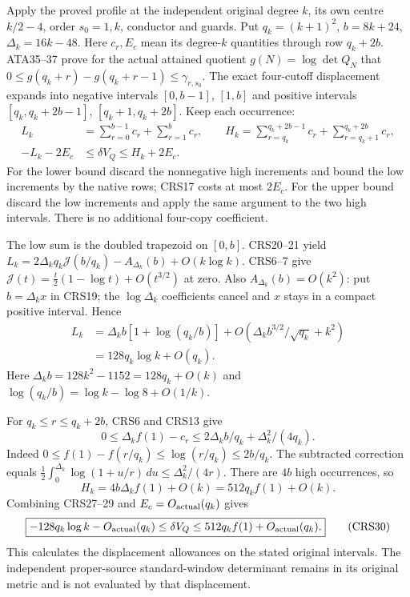 Apply the proved profile at the independent original degree $k$,
its own centre $k/2-4$, order $s_0=1,k$, conductor and guards.
Put $q_k=(k+1)^2$, $b=8k+24$, $\Delta_k=16k-48$.
Here $c_r,E_c$ mean its degree-$k$ quantities through row $q_k+2b$.
ATA35--37 prove for the actual attained quotient $g(N)=\log\det Q_N$
that $0\le g(q_k+r)-g(q_k+r-1)\le\gamma_{r,s_0}$.
The exact four-cutoff displacement expands into negative intervals
$[0,b-1]$, $[1,b]$ and positive intervals
$[q_k,q_k+2b-1]$, $[q_k+1,q_k+2b]$. Keep each occurrence:
\[
\begin{split}
 L_k&=\sum_{r=0}^{b-1}c_r+\sum_{r=1}^{b}c_r,\qquad
 H_k=\sum_{r=q_k}^{q_k+2b-1}c_r+
                               \sum_{r=q_k+1}^{q_k+2b}c_r,\\
 -L_k-2E_c&\le\delta V_Q\le H_k+2E_c .
\end{split}                                                    \tag{CRS27}
\]
For the lower bound discard the nonnegative high increments and
bound the low increments by the native rows; CRS17 costs at most
$2E_c$. For the upper bound discard the low increments and apply
the same argument to the two high intervals. There is no additional
four-copy coefficient.

The low sum is the doubled trapezoid on $[0,b]$. CRS20--21 yield
$L_k=2\Delta_kq_k\mathcal J(b/q_k)-A_{\Delta_k}(b)+O(k\log k)$.
CRS6--7 give
$\mathcal J(t)=\tfrac t2(1-\log t)+O(t^{3/2})$ at zero.
Also $A_{\Delta_k}(b)=O(k^2)$: put $b=\Delta_kx$ in CRS19;
the $\log\Delta_k$ coefficients cancel and $x$ stays in a compact
positive interval. Hence
\[
\begin{split}
 L_k&=\Delta_kb[1+\log(q_k/b)]
        +O(\Delta_kb^{3/2}/\sqrt{q_k}+k^2)\\
    &=128q_k\log k+O(q_k).
\end{split}                                                    \tag{CRS28}
\]
Here $\Delta_kb=128k^2-1152=128q_k+O(k)$ and
$\log(q_k/b)=\log k-\log8+O(1/k)$.

For $q_k\le r\le q_k+2b$, CRS6 and CRS13 give
\[
 0\le\Delta_k f(1)-c_r
       \le2\Delta_k b/q_k+\Delta_k^2/(4q_k).
\]
Indeed $0\le f(1)-f(r/q_k)\le\log(r/q_k)\le2b/q_k$.
The subtracted correction equals
$\tfrac12\int_0^{\Delta_k}\log(1+u/r)\,du
\le\Delta_k^2/(4r)$. There are $4b$ high occurrences, so
\[
 H_k=4b\Delta_k f(1)+O(k)=512q_k f(1)+O(k).            \tag{CRS29}
\]
Combining CRS27--29 and $E_c=O_{\rm actual}(q_k)$ gives
\[
 \boxed{-128q_k\log k-O_{\rm actual}(q_k)
       \le\delta V_Q\le512q_k f(1)+O_{\rm actual}(q_k).}\tag{CRS30}
\]
This calculates the displacement allowances on the stated original
intervals. The independent proper-source standard-window determinant
remains in its original metric and is not evaluated by that displacement.

